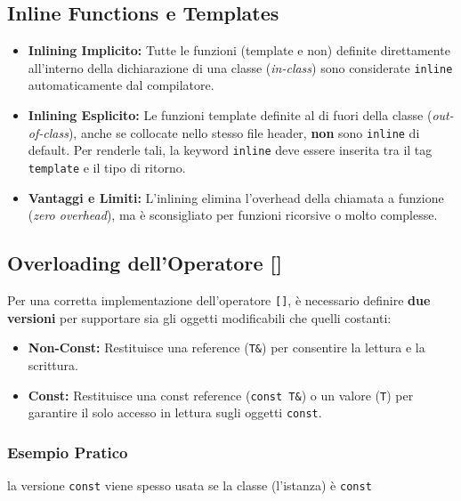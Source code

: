 \subsection{Inline Functions e Templates}

\begin{itemize}
    \item \textbf{Inlining Implicito:} Tutte le funzioni (template e non) definite direttamente all'interno della dichiarazione di una classe (\textit{in-class}) sono considerate \texttt{inline} automaticamente dal compilatore.
    \item \textbf{Inlining Esplicito:} Le funzioni template definite al di fuori della classe (\textit{out-of-class}), anche se collocate nello stesso file header, \textbf{non} sono \texttt{inline} di default. Per renderle tali, la keyword \texttt{inline} deve essere inserita tra il tag \texttt{template} e il tipo di ritorno.
    \item \textbf{Vantaggi e Limiti:} L'inlining elimina l'overhead della chiamata a funzione (\textit{zero overhead}), ma è sconsigliato per funzioni ricorsive o molto complesse.
\end{itemize}

\subsection{Overloading dell'Operatore []}

Per una corretta implementazione dell'operatore \texttt{[]}, è necessario definire \textbf{due versioni} per supportare sia gli oggetti modificabili che quelli costanti:

\begin{itemize}
    \item \textbf{Non-Const:} Restituisce una reference (\texttt{T\&}) per consentire la lettura e la scrittura.
    \item \textbf{Const:} Restituisce una const reference (\texttt{const T\&}) o un valore (\texttt{T}) per garantire il solo accesso in lettura sugli oggetti \texttt{const}.
\end{itemize}

\subsubsection{Esempio Pratico}



la versione \texttt{const} viene spesso usata se la classe (l'istanza) è \texttt{const}

